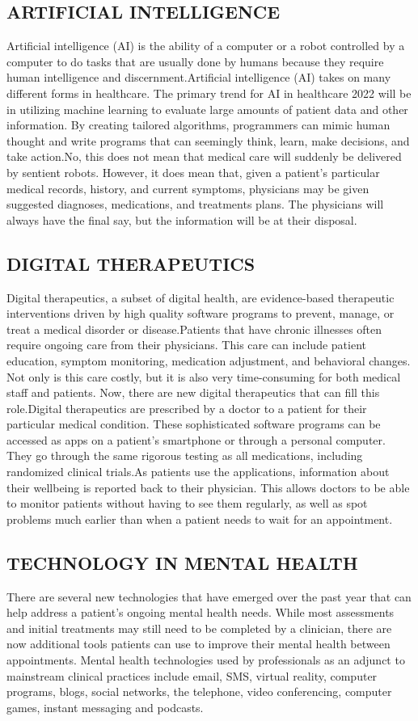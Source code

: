 \documentclass{article}
\begin{document}
\subsection{ARTIFICIAL INTELLIGENCE}
Artificial intelligence (AI) is the ability of a computer or a robot controlled by a computer to do tasks that are usually done by humans because they require human intelligence and discernment.Artificial intelligence (AI) takes on many different forms in healthcare. The primary trend for AI in healthcare 2022 will be in utilizing machine learning to evaluate large amounts of patient data and other information. By creating tailored algorithms, programmers can mimic human thought and write programs that can seemingly think, learn, make decisions, and take action.No, this does not mean that medical care will suddenly be delivered by sentient robots. However, it does mean that, given a patient’s particular medical records, history, and current symptoms, physicians may be given suggested diagnoses, medications, and treatments plans. The physicians will always have the final say, but the information will be at their disposal.
\subsection{DIGITAL THERAPEUTICS}
Digital therapeutics, a subset of digital health, are evidence-based therapeutic interventions driven by high quality software programs to prevent, manage, or treat a medical disorder or disease.Patients that have chronic illnesses often require ongoing care from their physicians. This care can include patient education, symptom monitoring, medication adjustment, and behavioral changes. Not only is this care costly, but it is also very time-consuming for both medical staff and patients. Now, there are new digital therapeutics that can fill this role.Digital therapeutics are prescribed by a doctor to a patient for their particular medical condition. These sophisticated software programs can be accessed as apps on a patient’s smartphone or through a personal computer. They go through the same rigorous testing as all medications, including randomized clinical trials.As patients use the applications, information about their wellbeing is reported back to their physician. This allows doctors to be able to monitor patients without having to see them regularly, as well as spot problems much earlier than when a patient needs to wait for an appointment.
\subsection{TECHNOLOGY IN MENTAL HEALTH}
There are several new technologies that have emerged over the past year that can help address a patient’s ongoing mental health needs. While most assessments and initial treatments may still need to be completed by a clinician, there are now additional tools patients can use to improve their mental health between appointments.
Mental health technologies used by professionals as an adjunct to mainstream clinical practices include email, SMS, virtual reality, computer programs, blogs, social networks, the telephone, video conferencing, computer games, instant messaging and podcasts.
\end{document}
